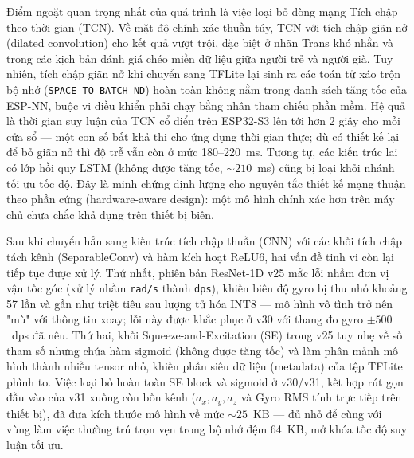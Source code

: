\documentclass[../DoAn.tex]{subfiles}
\begin{document}
Điểm ngoặt quan trọng nhất của quá trình là việc loại bỏ dòng mạng Tích chập theo thời gian (TCN). Về mặt độ chính xác thuần túy, TCN với tích chập giãn nở (dilated convolution) cho kết quả vượt trội, đặc biệt ở nhãn Trans khó nhằn và trong các kịch bản đánh giá chéo miền dữ liệu giữa người trẻ và người già. Tuy nhiên, tích chập giãn nở khi chuyển sang TFLite lại sinh ra các toán tử xáo trộn bộ nhớ (\texttt{SPACE\_TO\_BATCH\_ND}) hoàn toàn không nằm trong danh sách tăng tốc của ESP-NN, buộc vi điều khiển phải chạy bằng nhân tham chiếu phần mềm. Hệ quả là thời gian suy luận của TCN cổ điển trên ESP32-S3 lên tới hơn 2 giây cho mỗi cửa sổ --- một con số bất khả thi cho ứng dụng thời gian thực; dù có thiết kế lại để bỏ giãn nở thì độ trễ vẫn còn ở mức 180--220~ms. Tương tự, các kiến trúc lai có lớp hồi quy LSTM (không được tăng tốc, $\sim 210$~ms) cũng bị loại khỏi nhánh tối ưu tốc độ. Đây là minh chứng định lượng cho nguyên tắc thiết kế mạng thuận theo phần cứng (hardware-aware design): một mô hình chính xác hơn trên máy chủ chưa chắc khả dụng trên thiết bị biên.

Sau khi chuyển hẳn sang kiến trúc tích chập thuần (CNN) với các khối tích chập tách kênh (SeparableConv) và hàm kích hoạt ReLU6, hai vấn đề tinh vi còn lại tiếp tục được xử lý. Thứ nhất, phiên bản ResNet-1D v25 mắc lỗi nhầm đơn vị vận tốc góc (xử lý nhầm \texttt{rad/s} thành \texttt{dps}), khiến biên độ gyro bị thu nhỏ khoảng 57 lần và gần như triệt tiêu sau lượng tử hóa INT8 --- mô hình vô tình trở nên "mù" với thông tin xoay; lỗi này được khắc phục ở v30 với thang đo gyro $\pm 500$~dps đã nêu. Thứ hai, khối Squeeze-and-Excitation (SE) trong v25 tuy nhẹ về số tham số nhưng chứa hàm sigmoid (không được tăng tốc) và làm phân mảnh mô hình thành nhiều tensor nhỏ, khiến phần siêu dữ liệu (metadata) của tệp TFLite phình to. Việc loại bỏ hoàn toàn SE block và sigmoid ở v30/v31, kết hợp rút gọn đầu vào của v31 xuống còn bốn kênh ($a_x, a_y, a_z$ và Gyro RMS tính trực tiếp trên thiết bị), đã đưa kích thước mô hình về mức $\sim 25$~KB --- đủ nhỏ để cùng với vùng làm việc thường trú trọn vẹn trong bộ nhớ đệm 64~KB, mở khóa tốc độ suy luận tối ưu.
\end{document}
